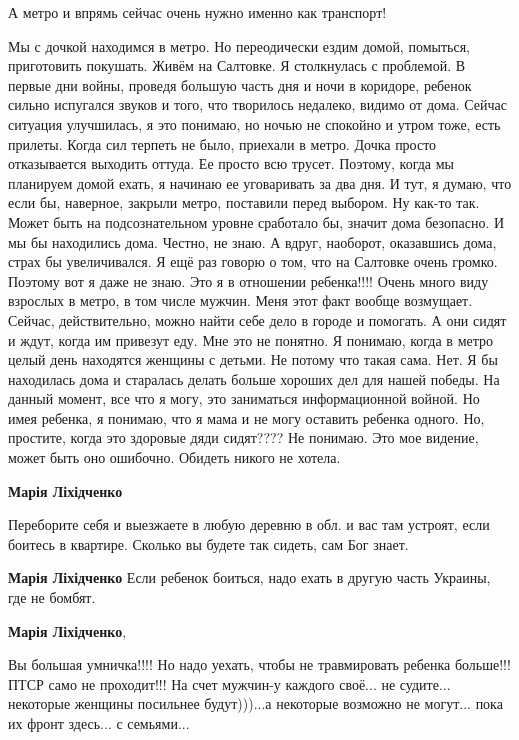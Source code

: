 \begin{itemize}
А метро и впрямь сейчас очень нужно именно как транспорт!


Мы с дочкой находимся в метро. Но переодически ездим домой, помыться,
приготовить покушать. Живём на Салтовке. Я столкнулась с проблемой. В первые
дни войны, проведя большую часть дня и ночи в коридоре, ребенок сильно
испугался звуков и того, что творилось недалеко, видимо от дома. Сейчас
ситуация улучшилась, я это понимаю, но ночью не спокойно и утром тоже, есть
прилеты. Когда сил терпеть не было, приехали в метро. Дочка просто отказывается
выходить оттуда. Ее просто всю трусет. Поэтому, когда мы планируем домой ехать,
я начинаю ее уговаривать за два дня. И тут, я думаю, что если бы, наверное,
закрыли метро, поставили перед выбором. Ну как-то так. Может быть на
подсознательном уровне сработало бы, значит дома безопасно. И мы бы находились
дома. Честно, не знаю. А вдруг, наоборот, оказавшись дома, страх бы
увеличивался. Я ещё раз говорю о том, что на Салтовке очень громко. Поэтому вот
я даже не знаю. Это я в отношении ребенка!!!! Очень много виду взрослых в
метро, в том числе мужчин. Меня этот факт вообще возмущает. Сейчас,
действительно, можно найти себе дело в городе и помогать. А они сидят и ждут,
когда им привезут еду. Мне это не понятно. Я понимаю, когда в метро целый день
находятся женщины с детьми. Не потому что такая сама. Нет. Я бы находилась дома
и старалась делать больше хороших дел для нашей победы. На данный момент, все
что я могу, это заниматься информационной войной. Но имея ребенка, я понимаю,
что я мама и не могу оставить ребенка одного. Но, простите, когда это здоровые
дяди сидят???? Не понимаю. Это мое видение, может быть оно ошибочно. Обидеть
никого не хотела.

\begin{itemize} %
\textbf{Марія Ліхідченко} 

Переборите себя и выезжаете в любую деревню в обл. и вас там устроят, если
боитесь в квартире. Сколько вы будете так сидеть, сам Бог знает.

\textbf{Марія Ліхідченко} Если ребенок боиться, надо ехать в другую часть Украины, где не бомбят.

\textbf{Марія Ліхідченко},

Вы большая умничка!!!! Но надо уехать, чтобы не травмировать ребенка
больше!!! ПТСР само не проходит!!! На счет мужчин-у каждого своё... не
судите... некоторые женщины посильнее будут)))...а некоторые возможно не
могут... пока их фронт здесь... с семьями...


\end{itemize}
\end{itemize}
